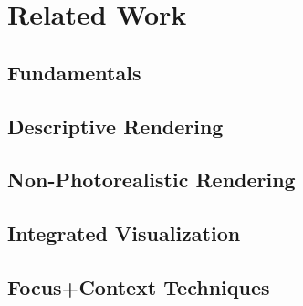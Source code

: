 \chapter{Related Work}
\section{Fundamentals}
\section{Descriptive Rendering}
\section{Non-Photorealistic Rendering}
\section{Integrated Visualization}
\section{Focus+Context Techniques}